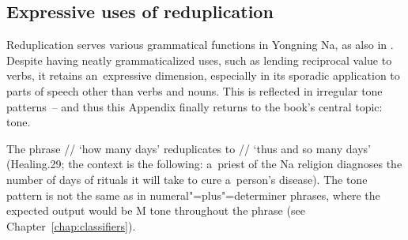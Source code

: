 %			
%			
%			
%			
%			
%			
%			
%			
%			
			
			\subsection{Expressive uses of reduplication}
			\label{sec:thereduplicationofnonlexicalwords}
			
			Reduplication serves various grammatical functions in Yongning Na, as also in  \citep[30–33]{heetal1985}. Despite having neatly grammaticalized uses, such as lending reciprocal value to verbs, it retains an~expressive dimension, especially in its sporadic application to parts of speech other than verbs and nouns. This is reflected in irregular tone patterns~-- and thus this Appendix finally returns to the book's central topic: tone.
			
			The phrase // ‘how many days’ reduplicates to // ‘thus and so
			many days’ (Healing.29; the context is the following: a~priest of the Na religion diagnoses the
			number of days of rituals it will take to cure a~person’s disease). The tone pattern is
			not the same as in numeral"=plus"=determiner phrases, where the expected output would be M tone
			throughout the phrase (see Chapter~\ref{chap:classifiers}).
			
